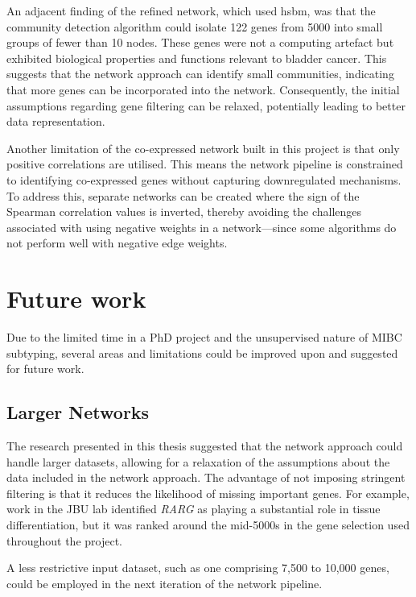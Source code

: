 An adjacent finding of the refined network, which used \acrshort{hsbm}, was that the community detection algorithm could isolate 122 genes from 5000 into small groups of fewer than 10 nodes. These genes were not a computing artefact but exhibited biological properties and functions relevant to bladder cancer. This suggests that the network approach can identify small communities, indicating that more genes can be incorporated into the network. Consequently, the initial assumptions regarding gene filtering can be relaxed, potentially leading to better data representation.

Another limitation of the co-expressed network built in this project is that only positive correlations are utilised. This means the network pipeline is constrained to identifying co-expressed genes without capturing downregulated mechanisms. To address this, separate networks can be created where the sign of the Spearman correlation values is inverted, thereby avoiding the challenges associated with using negative weights in a network—since some algorithms do not perform well with negative edge weights.


\section{Future work} \label{s:future_work}

Due to the limited time in a PhD project and the unsupervised nature of MIBC subtyping, several areas and limitations could be improved upon and suggested for future work.

\subsection*{Larger Networks}

The research presented in this thesis suggested that the network approach could handle larger datasets, allowing for a relaxation of the assumptions about the data included in the network approach. The advantage of not imposing stringent filtering is that it reduces the likelihood of missing important genes. For example, work in the JBU lab identified \textit{RARG} as playing a substantial role in tissue differentiation, but it was ranked around the mid-5000s in the gene selection used throughout the project.

A less restrictive input dataset, such as one comprising 7,500 to 10,000 genes, could be employed in the next iteration of the network pipeline.

